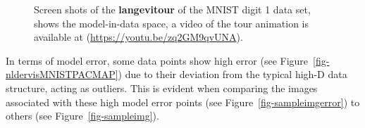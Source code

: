 \documentclass[
  12pt]{article}
\begin{document}
\begin{figure}[H]
\begin{minipage}{0.33\linewidth}
{}

\subcaption{\label{fig-mnist1_sc2}}

\end{minipage}%
%
\begin{minipage}{0.33\linewidth}


\subcaption{\label{fig-mnist1_sc3}}

\end{minipage}%

\caption{\label{fig-mnist1_sc}Screen shots of the \textbf{langevitour}
of the MNIST digit 1 data set, shows the model-in-data space, a video of
the tour animation is available at
(\url{https://youtu.be/zq2GM9qvUNA}).}

\end{figure}%

In terms of model error, some data points show high error (see
Figure~\ref{fig-nldervisMNISTPACMAP}) due to their deviation from the
typical high-D data structure, acting as outliers. This is evident when
comparing the images associated with these high model error points (see
Figure~\ref{fig-sampleimgerror}) to others (see
Figure~\ref{fig-sampleimg}).
\end{document}
